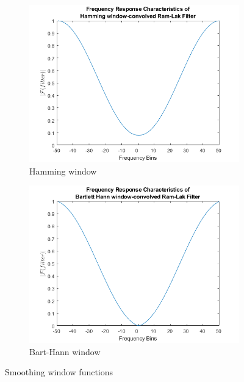 \documentclass[journal]{IEEEtran}
\begin{document}
\begin{figure}[h]
	\centering
	\begin{subfigure}[b]{0.45\columnwidth}
		\centering
	  \includegraphics[width=\linewidth]{images/hamm.png}
	  \caption{Hamming window}
	  \label{fig:hamm}
	\end{subfigure}
	\begin{subfigure}[b]{0.45\columnwidth}
		\centering
	  \includegraphics[width=\linewidth]{images/barthannresp.png}
	  \caption{Bart-Hann window}
	  \label{fig:bart}
	\end{subfigure}
	\caption{Smoothing window functions}
	\label{fig:smoothingfilters}
\end{figure}
\end{document}

